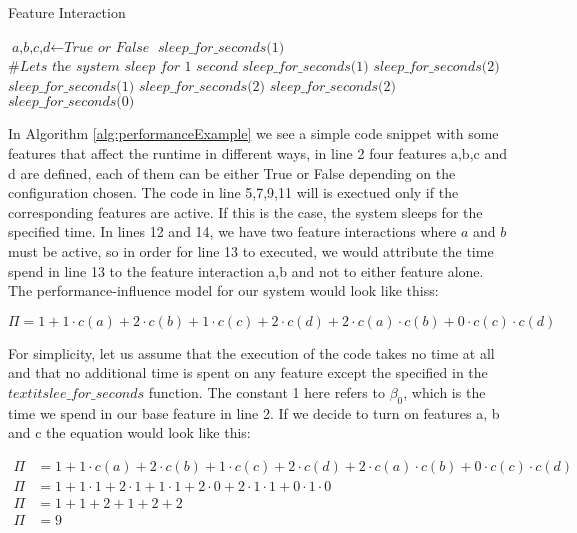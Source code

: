 \makeatletter
\def\BState{\State\hskip-\ALG@thistlm}
\makeatother

\begin{algorithm}
\caption{Feature Interaction \label{alg:performanceExample}}
\begin{algorithmic}[1]
\State $\textit{a,b,c,d} \gets \textit{True or False}$
\State $\textit{sleep\_for\_seconds(1)}$ $\textit{\#Lets the system sleep for 1 second}$
    \State $\textit{sleep\_for\_seconds(1)}$
\EndIf
{} 
    \State $\textit{sleep\_for\_seconds(2)}$
\EndIf
{} 
    \State $\textit{sleep\_for\_seconds(1)}$
\EndIf
{} 
    \State $\textit{sleep\_for\_seconds(2)}$
\EndIf
{} 
    \State $\textit{sleep\_for\_seconds(2)}$
\EndIf
{} 
    \State $\textit{sleep\_for\_seconds(0)}$
\EndIf

\EndProcedure
\end{algorithmic}
\end{algorithm}


In Algorithm \ref{alg:performanceExample} we see a simple code snippet with some features that affect the runtime in different ways, in line 
2 four features a,b,c and d are defined, each of them can be either True or False depending on the configuration chosen. The code in
line 5,7,9,11 will is exectued only if the corresponding features are active. If this is the case, the system sleeps for the specified time. In lines
12 and 14, we have two feature interactions where $a$ and $b$ must be active, so in order for line 13 to executed, we would attribute the time spend
in line 13 to the feature interaction a,b and not to either feature alone.
The performance-influence model for our system would look like thiss:

\begin{equation*}
    \Pi = 1 + 1 \cdot c(a) + 2\cdot c(b) + 1\cdot c(c) + 2\cdot c(d) + 2 \cdot c(a)\cdot c(b) + 0\cdot c(c) \cdot c(d)
\end{equation*}

For simplicity, let us assume that the execution of the code takes no time at all and that no additional time is spent on any feature except 
the specified in the $textit{slee\_for\_seconds}$ function. The constant 1 here refers to $\beta_0$, which is the time we spend in our base 
feature in line 2. If we decide to turn on features a, b and c the equation would look like this:

\begin{align*}
    \Pi &= 1 + 1 \cdot c(a) + 2\cdot c(b) + 1\cdot c(c) + 2\cdot c(d) + 2 \cdot c(a)\cdot c(b) + 0\cdot c(c) \cdot c(d) \\
    \Pi &= 1 + 1 \cdot 1 + 2 \cdot 1 + 1 \cdot 1 + 2 \cdot 0 + 2 \cdot 1 \cdot 1 + 0 \cdot 1 \cdot 0 \\
    \Pi &= 1 + 1 + 2 + 1 + 2 + 2 \\
    \Pi &= 9
\end{align*}

